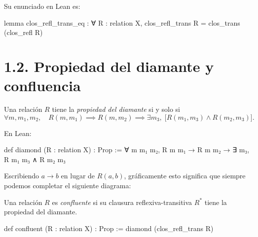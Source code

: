 \documentclass[
  spanish,
  letterpaper,
  DIV=11,
  numbers=noendperiod]{scrreprt}
\newenvironment{Shaded}{\begin{snugshade}}{\end{snugshade}}
\newcommand{\KeywordTok}[1]{\textcolor[rgb]{0.00,0.23,0.31}{\textbf{#1}}}
\newcommand{\NormalTok}[1]{\textcolor[rgb]{0.00,0.23,0.31}{#1}}
\renewcommand{\NormalTok}[1]{\textcolor[HTML]{000000}{#1}}
\renewcommand{\KeywordTok}[1]{\textcolor[HTML]{0000FF}{#1}}
\theoremstyle{remark}
\begin{document}
Su enunciado en Lean es:

\begin{Shaded}
\begin{Highlighting}[]
\KeywordTok{lemma}\NormalTok{ clos\_refl\_trans\_eq : ∀ R : relation X, }
\NormalTok{    clos\_refl\_trans R = clos\_trans (clos\_refl R)}
\end{Highlighting}
\end{Shaded}

\section{1.2. Propiedad del diamante y
confluencia}\label{propiedad-del-diamante-y-confluencia}

Una relación \(R\) tiene la \emph{propiedad del diamante} si y solo si
\[
\forall m,m_1,m_2,\quad
R(m,m_1)\implies R(m,m_2)\implies
\exists m_3,\;
\bigl[R(m_1,m_3)\land R(m_2,m_3)\bigr].
\]

En Lean:

\begin{Shaded}
\begin{Highlighting}[]
\KeywordTok{def}\NormalTok{ diamond (R : relation X) : }\KeywordTok{Prop}\NormalTok{ :=}
\NormalTok{  ∀ m m₁ m₂, R m m₁ → R m m₂ →}
\NormalTok{    ∃ m₃, R m₁ m₃ ∧ R m₂ m₃}
\end{Highlighting}
\end{Shaded}

Escribiendo \(a \longrightarrow b\) en lugar de \(R(a,b)\), gráficamente
esto significa que siempre podemos completar el siguiente diagrama:

\begin{center}
\end{center}

Una relación \(R\) es \emph{confluente} si su clausura
reflexiva-transitiva \(R^*\) tiene la propiedad del diamante.

\begin{Shaded}
\begin{Highlighting}[]
\KeywordTok{def}\NormalTok{ confluent (R : relation X) : }\KeywordTok{Prop}\NormalTok{ :=}
\NormalTok{  diamond (clos\_refl\_trans R)}
\end{Highlighting}
\end{Shaded}
\end{document}
